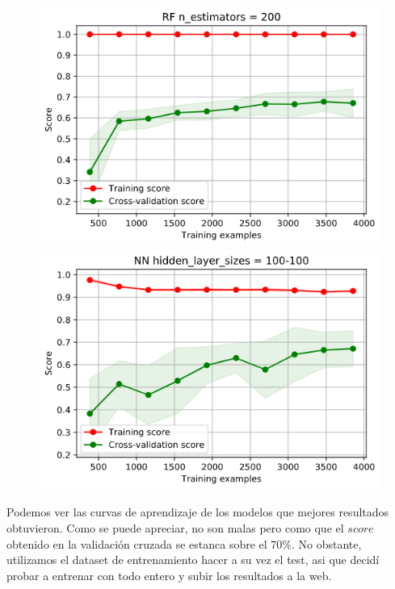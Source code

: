 \documentclass[11pt,a4paper]{article}
\begin{document}
    
\begin{figure}[H]
    \centering
    
    \begin{minipage}{0.5\textwidth}
        \centering
        \includegraphics[scale=0.35]{img/lc3.png}
    \end{minipage}%
    \begin{minipage}{0.5\textwidth}
        \centering
        \includegraphics[scale=0.35]{img/lc4.png}
    \end{minipage}
    
\end{figure}

Podemos ver las curvas de aprendizaje de los modelos que mejores resultados obtuvieron. Como se puede apreciar, no son malas pero
como que el $score$ obtenido en la validación cruzada se estanca sobre el 70\%. No obstante, utilizamos el dataset de entrenamiento
hacer a su vez el test, asi que decidí probar a entrenar con todo entero y subir los resultados a la web.
\end{document}
